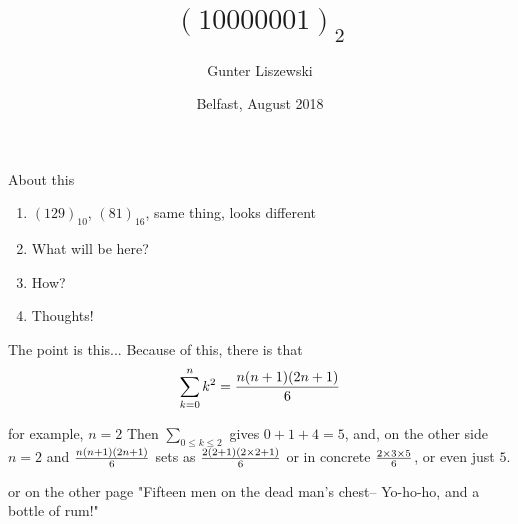 \documentclass[pdf]{beamer}
\title{$(10000001)_2$}
\author{Gunter Liszewski}
\date{Belfast, August 2018}
\begin{document}
\begin{frame}
  \titlepage
\end{frame}


\begin{frame}{About this}

  \begin{enumerate}[A]
    \pause
    \item $(129)_{10}$, $(81)_{16}$, same thing, looks different
    \pause
    \item What will be here?
    \pause
    \item How?
    \pause
    \item Thoughts!
  \end{enumerate}
\end{frame}

\begin{frame}{The point is this...}
  Because of this, there is that
$$\sum_{k=0}^{n}{k^2}={n(n+1)(2n+1)\over 6}$$
\end{frame}


\begin{frame}{for example, $n=2$}
  Then $\sum_{0\le k\le2}$ gives $0+1+4=5$, and, on the other side $n=2$ and ${n(n+1)(2n+1)\over 6}$
sets as ${2(2+1)(2\times2+1)\over 6}$ or in concrete $2\times3\times5\over6$, or even just $5$.
\end{frame}

\begin{frame}{or on the other page}
  "Fifteen men on the dead man's chest--
             Yo-ho-ho, and a bottle of rum!"
\end{frame}
\end{document}
